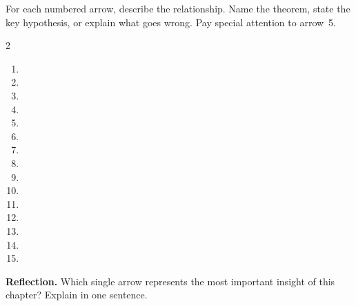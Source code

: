 \documentclass[worksheet]{workbook}
\begin{document}
\begin{center}
\end{center}

\medskip

 For each numbered arrow, describe the relationship.  Name the theorem, state the key hypothesis, or explain what goes wrong.  Pay special attention to arrow~5.

\smallskip
\footnotesize
\begin{multicols}{2}
\begin{enumerate}[label=\textbf{\arabic*.}, itemsep=0.85em, leftmargin=2em]
\item \dotfill
\item \dotfill
\item \dotfill
\item \dotfill
\item \dotfill
\item \dotfill
\item \dotfill
\item \dotfill
\columnbreak
\item \dotfill
\item \dotfill
\item \dotfill
\item \dotfill
\item \dotfill
\item \dotfill
\item \dotfill
\end{enumerate}
\end{multicols}

\normalsize

\noindent\textbf{Reflection.} Which single arrow represents the most important insight of this chapter?  Explain in one sentence.

\vfill
\end{document}
